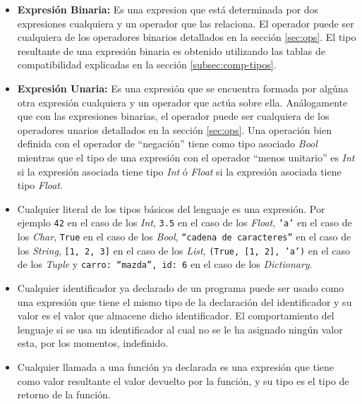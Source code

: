 \documentclass[12pt, spanish]{report}
\begin{document}
\begin{itemize}
\item \textbf{Expresi\'on Binaria:} Es una expresion que est\'a
  determinada por dos expresiones cualquiera y un operador que las
  relaciona. El operador puede ser cualquiera de los operadores
  binarios detallados en la secci\'on \ref{sec:ops}. El tipo
  resultante de una expresi\'on binaria es obtenido utilizando las
  tablas de compatibilidad explicadas en la secci\'on \ref{subsec:comp-tipos}.

\item \textbf{Expresi\'on Unaria:} Es una expresi\'on que se encuentra
  formada por alg\'una otra expresi\'on cualquiera y un operador que
  act\'ua sobre ella. An\'alogamente que con las expresiones binarias,
  el operador puede ser cualquiera de los operadores unarios
  detallados en la secci\'on \ref{sec:ops}. Una operaci\'on bien
  definida con el operador de ``negaci\'on'' tiene como tipo asociado
  \emph{Bool} mientras que el tipo de una expresi\'on con el operador
  ``menos unitario'' es \emph{Int} si la expresi\'on asociada tiene tipo
  \emph{Int} \'o \emph{Float} si la expresi\'on asociada tiene tipo
  \emph{Float}.

\item Cualquier literal de los tipos b\'asicos del lenguaje es una
  expresi\'on. Por ejemplo \texttt{42} en el caso de los \emph{Int},
  \texttt{3.5} en el caso de los \emph{Float}, \texttt{'a'} en el caso
  de los \emph{Char}, \texttt{True} en el caso de los \emph{Bool},
  \texttt{``cadena de caracteres''} en el caso de los \emph{String},
  \texttt{[1, 2, 3]} en el caso de los \emph{List}, \texttt{(True, [1,
    2], 'a')} en el caso de los \emph{Tuple} y \texttt{{carro:
      ``mazda'', id: 6}} en el caso de los \emph{Dictionary}.

\item Cualquier identificador ya declarado de un programa puede ser
  usado como una expresi\'on que tiene el mismo tipo de la
  declaraci\'on del identificador y su valor es el valor que almacene
  dicho identificador. El comportamiento del lenguaje si se usa un
  identificador al cual no se le ha asignado ning\'un valor esta, por
  los momentos, indefinido.

\item Cualquier llamada a una funci\'on ya declarada es una
  expresi\'on que tiene como valor resultante el valor devuelto por la
  funci\'on, y su tipo es el tipo de retorno de la funci\'on.
\end{itemize}
\end{document}
